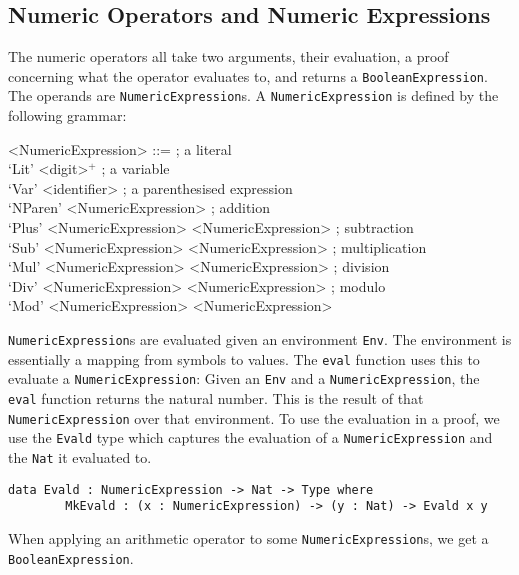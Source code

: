     \subsection{Numeric Operators and Numeric Expressions}
        The numeric operators all take two arguments, their evaluation, a proof concerning what the operator evaluates to, and returns a \texttt{BooleanExpression}.
        The operands are \texttt{NumericExpression}s. A \texttt{NumericExpression} is defined by the following grammar:
        \setlength{\grammarindent}{12em}
        \begin{grammar}
            <NumericExpression>
            ::=  ; a literal\\
                 `Lit' <digit>$^+$
            \alt ; a variable\\
                 `Var' <identifier>
            \alt ; a parenthesised expression\\
                 `NParen' <NumericExpression>
            \alt ; addition\\
                 `Plus' <NumericExpression> <NumericExpression>
            \alt ; subtraction\\
                 `Sub' <NumericExpression> <NumericExpression>
            \alt ; multiplication\\
                 `Mul' <NumericExpression> <NumericExpression>
            \alt ; division\\
                 `Div' <NumericExpression> <NumericExpression>
            \alt ; modulo\\
                 `Mod' <NumericExpression> <NumericExpression>
        \end{grammar}
        \texttt{NumericExpression}s are evaluated given an environment \texttt{Env}. The environment is essentially a mapping from symbols to values. The \texttt{eval} function uses this to evaluate a \texttt{NumericExpression}: Given an \texttt{Env} and a \texttt{NumericExpression}, the \texttt{eval} function returns the natural number. This is the result of that \texttt{NumericExpression} over that environment. To use the evaluation in a proof, we use the \texttt{Evald} type which captures the evaluation of a \texttt{NumericExpression} and the \texttt{Nat} it evaluated to.
        \begin{lstlisting}[caption={\texttt{Evald} as defined in the \textsc{TeamPlay} CSL}]
    data Evald : NumericExpression -> Nat -> Type where
        MkEvald : (x : NumericExpression) -> (y : Nat) -> Evald x y
        \end{lstlisting}
        When applying an arithmetic operator to some \texttt{NumericExpression}s, we get a \texttt{BooleanExpression}.
    
